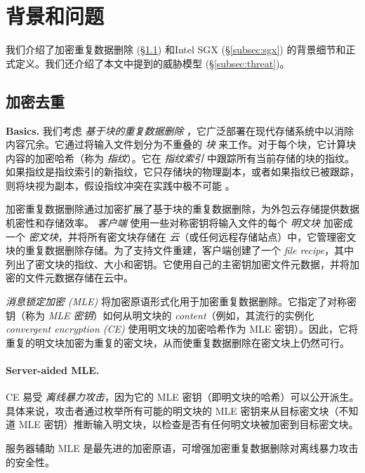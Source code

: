 \section{背景和问题}
\label{sec:background}

我们介绍了加密重复数据删除 (\S\ref{subsec:encrypted-dedup}) 和Intel SGX (\S\ref{subsec:sgx}) 的背景细节和正式定义。我们还介绍了本文中提到的威胁模型 (\S\ref{subsec:threat})。

\subsection{加密去重}
\label{subsec:encrypted-dedup}

\noindent
{\bf Basics.} 我们考虑 \textit{ 基于块的重复数据删除} \cite{zhu08,wallace12,meyer11}，它广泛部署在现代存储系统中以消除内容冗余。它通过将输入文件划分为不重叠的 \textit{ 块} 来工作。对于每个块，它计算块内容的加密哈希（称为 \textit{ 指纹}）。它在 \textit{ 指纹索引} 中跟踪所有当前存储的块的指纹。如果指纹是指纹索引的新指纹，它只存储块的物理副本，或者如果指纹已被跟踪，则将块视为副本，假设指纹冲突在实践中极不可能 \cite{black06}。
   
加密重复数据删除通过加密扩展了基于块的重复数据删除，为外包云存储提供数据机密性和存储效率。 \textit{ 客户端} 使用一些对称密钥将输入文件的每个 \textit{ 明文块} 加密成一个 \textit{ 密文块}，并将所有密文块存储在 \textit{ 云}（或任何远程存储站点）中，它管理密文块的重复数据删除存储。为了支持文件重建，客户端创建了一个 \textit{ file recipe}，其中列出了密文块的指纹、大小和密钥。它使用自己的主密钥加密文件元数据，并将加密的文件元数据存储在云中。

\textit{ 消息锁定加密 (MLE)} \cite{bellare13a} 将加密原语形式化用于加密重复数据删除。它指定了对称密钥（称为 \textit{ MLE 密钥}）如何从明文块的 \textit{ content}（例如，其流行的实例化 \textit{ convergent encryption (CE)} \cite{douceur02}使用明文块的加密哈希作为 MLE 密钥）。因此，它将重复的明文块加密为重复的密文块，从而使重复数据删除在密文块上仍然可行。

\paragraph{Server-aided MLE.} CE 易受 \textit{ 离线暴力攻击}，因为它的 MLE 密钥（即明文块的哈希）可以公开派生。具体来说，攻击者通过枚举所有可能的明文块的 MLE 密钥来从目标密文块（不知道 MLE 密钥）推断输入明文块，以检查是否有任何明文块被加密到目标密文块。

服务器辅助 MLE \cite{bellare13b} 是最先进的加密原语，可增强加密重复数据删除对离线暴力攻击的安全性。

